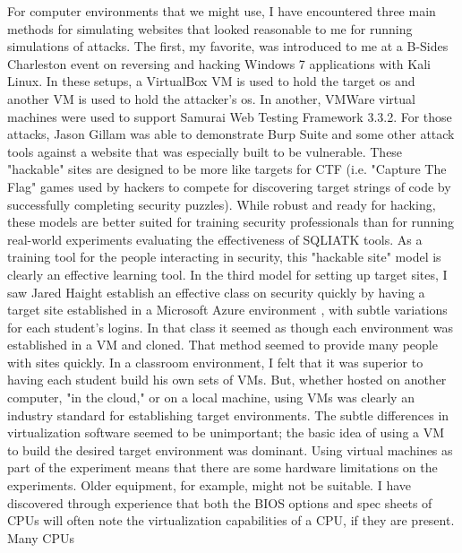 For computer environments that we might use, I have encountered three main methods for simulating websites that looked reasonable to me for running simulations of attacks.  The first, my favorite, was introduced to me at a B-Sides Charleston event on reversing and hacking Windows 7 applications with Kali Linux.  In these setups, a VirtualBox VM  is used to hold the target \gls{os} and another VM is used to hold the attacker's \gls{os}.  In another, VMWare virtual machines  were used to support Samurai Web Testing Framework 3.3.2.  For those attacks, Jason Gillam was able to demonstrate Burp Suite and some other \gls{attack} tools against a website that was especially built to be vulnerable.  These "hackable" sites are designed to be more like targets for CTF (i.e. "Capture The Flag" games used by hackers to compete for discovering target strings of code by successfully completing security puzzles).  While robust and ready for hacking, these models are better suited for training security professionals than for running real-world experiments evaluating the effectiveness of SQLIATK tools.  As a training tool for the people interacting in security, this "hackable site" model is clearly an effective learning tool.   In the third model for setting up target sites, I saw Jared Haight establish an effective class on security quickly by having a target site established in a Microsoft Azure environment , with subtle variations for each student's logins.  In that class it seemed as though each environment was established in a VM and cloned.  That method seemed to provide many people with sites quickly.  In a classroom environment, I felt that it was superior to having each student build his own sets of VMs.  But, whether hosted on another computer, "in the cloud," or on a local machine, using VMs was clearly an industry standard for establishing target environments.  The subtle differences in \gls{virtualization} software seemed to be unimportant; the basic idea of using a VM to build the desired target environment was dominant.  Using virtual machines as part of the experiment means that there are some hardware limitations on the experiments.  Older equipment, for example, might not be suitable.  I have discovered through experience that both the BIOS options and spec sheets of CPUs will often note the \gls{virtualization} capabilities of a CPU, if they are present.  Many CPUs 